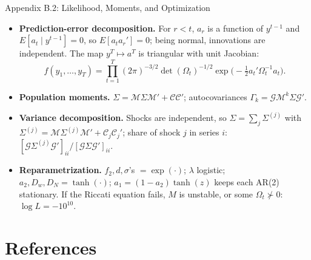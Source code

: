 \documentclass[10pt]{beamer}
\begin{document}
\begin{frame}{Appendix B.2: Likelihood, Moments, and Optimization}
  \small
  \begin{itemize}
    \item \textbf{Prediction-error decomposition.} For $r<t$, $a_r$ is a function of $y^{t-1}$ and $E[a_t\mid y^{t-1}]=0$, so $E[a_ta_r']=0$; being normal, innovations are independent. The map $y^T\mapsto a^T$ is triangular with unit Jacobian:
      \[ f(y_1,\dots,y_T)=\prod_{t=1}^T(2\pi)^{-3/2}\det(\Omega_t)^{-1/2}\exp\!\Big(-\tfrac12a_t'\Omega_t^{-1}a_t\Big). \]
    \item \textbf{Population moments.} $\Sigma=\mathcal M\Sigma\mathcal M'+\mathcal C\mathcal C'$; autocovariances $\Gamma_k=\mathcal G\mathcal M^k\Sigma\mathcal G'$.
    \item \textbf{Variance decomposition.} Shocks are independent, so $\Sigma=\sum_j\Sigma^{(j)}$ with $\Sigma^{(j)}=\mathcal M\Sigma^{(j)}\mathcal M'+\mathcal C_j\mathcal C_j'$; share of shock $j$ in series $i$: $[\mathcal G\Sigma^{(j)}\mathcal G']_{ii}/[\mathcal G\Sigma\mathcal G']_{ii}$.
    \item \textbf{Reparametrization.} $f_2,d,\sigma$'s $=\exp(\cdot)$; $\lambda$ logistic; $a_2,D_w,D_N=\tanh(\cdot)$; $a_1=(1-a_2)\tanh(z)$ keeps each AR(2) stationary. If the Riccati equation fails, $M$ is unstable, or some $\Omega_t\not\succ0$: $\log L=-10^{10}$.
  \end{itemize}
\end{frame}

\section{References}

\end{document}
